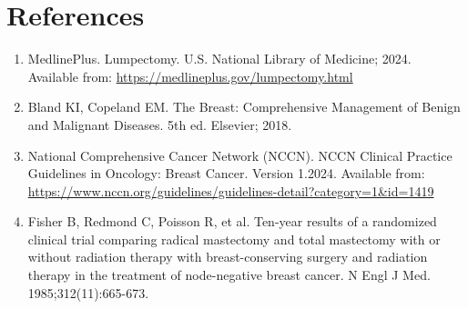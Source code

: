 \section*{References}
\begin{enumerate}
  \item MedlinePlus. Lumpectomy. U.S. National Library of Medicine; 2024. Available from: \url{https://medlineplus.gov/lumpectomy.html}
  
  \item Bland KI, Copeland EM. The Breast: Comprehensive Management of Benign and Malignant Diseases. 5th ed. Elsevier; 2018.
  
  \item National Comprehensive Cancer Network (NCCN). NCCN Clinical Practice Guidelines in Oncology: Breast Cancer. Version 1.2024. Available from: \url{https://www.nccn.org/guidelines/guidelines-detail?category=1\&id=1419}
  
  \item Fisher B, Redmond C, Poisson R, et al. Ten-year results of a randomized clinical trial comparing radical mastectomy and total mastectomy with or without radiation therapy with breast-conserving surgery and radiation therapy in the treatment of node-negative breast cancer. N Engl J Med. 1985;312(11):665-673.
\end{enumerate}

\clearpage
